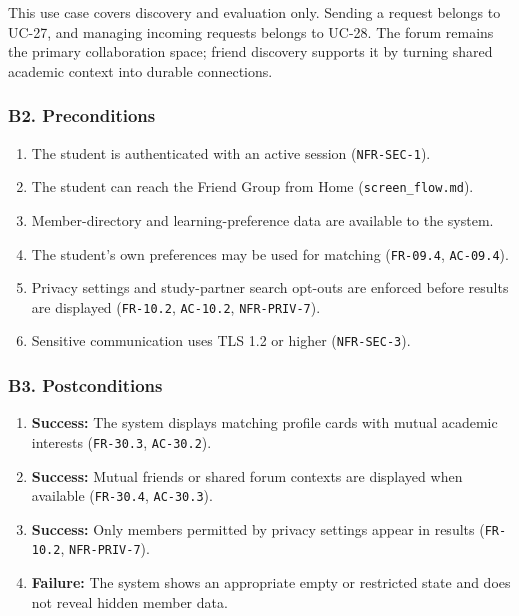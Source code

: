 \documentclass[12pt]{article}
\begin{document}
This use case covers discovery and evaluation only. Sending a request belongs to UC-27, and managing incoming requests belongs to UC-28. The forum remains the primary collaboration space; friend discovery supports it by turning shared academic context into durable connections.
\par\medskip

\hypertarget{sec:b2-preconditions}{}
\subsubsection*{B2. Preconditions}
\par\medskip

\begin{enumerate}
\item The student is authenticated with an active session (\texttt{NFR-SEC-1}).
\item The student can reach the Friend Group from Home (\texttt{screen\_flow.md}).
\item Member-directory and learning-preference data are available to the system.
\item The student's own preferences may be used for matching (\texttt{FR-09.4}, \texttt{AC-09.4}).
\item Privacy settings and study-partner search opt-outs are enforced before results are displayed (\texttt{FR-10.2}, \texttt{AC-10.2}, \texttt{NFR-PRIV-7}).
\item Sensitive communication uses TLS 1.2 or higher (\texttt{NFR-SEC-3}).
\end{enumerate}
\par\medskip

\hypertarget{sec:b3-postconditions}{}
\subsubsection*{B3. Postconditions}
\par\medskip

\begin{enumerate}
\item \textbf{Success:} The system displays matching profile cards with mutual academic interests (\texttt{FR-30.3}, \texttt{AC-30.2}).
\item \textbf{Success:} Mutual friends or shared forum contexts are displayed when available (\texttt{FR-30.4}, \texttt{AC-30.3}).
\item \textbf{Success:} Only members permitted by privacy settings appear in results (\texttt{FR-10.2}, \texttt{NFR-PRIV-7}).
\item \textbf{Failure:} The system shows an appropriate empty or restricted state and does not reveal hidden member data.
\end{enumerate}
\par\medskip
\end{document}
